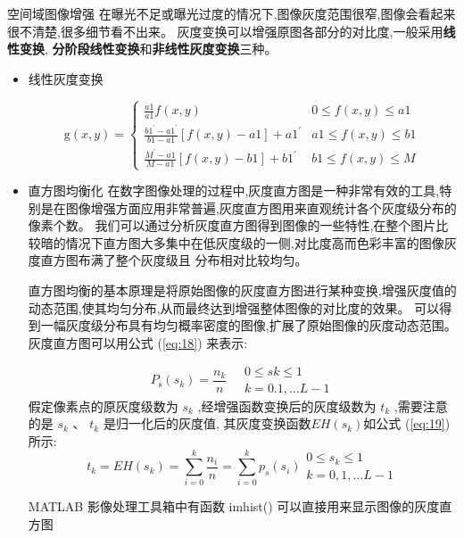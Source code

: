 \documentclass{amsart}
\begin{document}
空间域图像增强
在曝光不足或曝光过度的情况下,图像灰度范围很窄,图像会看起来很不清楚,很多细节看不出来。
灰度变换可以增强原图各部分的对比度,一般采用\textbf{线性变换},
\textbf{分阶段线性变换}和\textbf{非线性灰度变换}三种。
\begin{itemize}
\item 线性灰度变换

  \begin{equation}
    \label{eq:17}
    \mathrm{g}(x, y)=\left\{\begin{array}{cc}
\frac{a 1}{a 1} f(x, y) & 0 \leq f(x, y) \leq a 1 \\
\frac{b 1^{\prime}-a 1^{\prime}}{b 1-a 1}[f(x, y)-a 1]+a 1^{\prime} & a 1 \leq f(x, y) \leq b 1 \\
\frac{M^{\prime}-a 1}{M-a 1}[f(x, y)-b 1]+b 1^{\prime} & b 1 \leq f(x, y) \leq M
\end{array}\right.
  \end{equation}
\item 直方图均衡化
  在数字图像处理的过程中,灰度直方图是一种非常有效的工具,特别是在图像增强方面应用非常普遍,灰度直方图用来直观统计各个灰度级分布的像素个数。
  我们可以通过分析灰度直方图得到图像的一些特性,在整个图片比较暗的情况下直方图大多集中在低灰度级的一侧,对比度高而色彩丰富的图像灰度直方图布满了整个灰度级且  分布相对比较均匀。


  直方图均衡的基本原理是将原始图像的灰度直方图进行某种变换,增强灰度值的动态范围,使其均匀分布,从而最终达到增强整体图像的对比度的效果。
  可以得到一幅灰度级分布具有均匀概率密度的图像,扩展了原始图像的灰度动态范围。灰度直方图可以用公式 (\ref{eq:18}) 来表示:

  \begin{equation}
    \label{eq:18}
    P_{\mathrm{s}}\left(s_{k}\right)=\frac{n_{k}}{n} \quad \begin{array}{c}
0 \leq s k \leq 1 \\
k=0.1, \ldots L-1
\end{array}
\end{equation}
假定像素点的原灰度级数为 $s_k$ ,经增强函数变换后的灰度级数为 $t_k$ ,需要注意的是 $s_k$ 、 $t_k$ 是归一化后的灰度值,
其灰度变换函数$ EH(s_k )$如公式 (\ref{eq:19})所示:
\begin{equation}
  \label{eq:19}
  t_{k}=E H\left(s_{k}\right)=\sum_{i=0}^{k} \frac{n_{i}}{n}=\sum_{i=0}^{k} p_{s}\left(s_{i}\right) \begin{array}{c}
0 \leq s_{k} \leq 1 \\
k=0,1, \ldots L-1
\end{array}
\end{equation}

MATLAB 影像处理工具箱中有函数 imhist() 可以直接用来显示图像的灰度直方图
\end{itemize}
\end{document}
